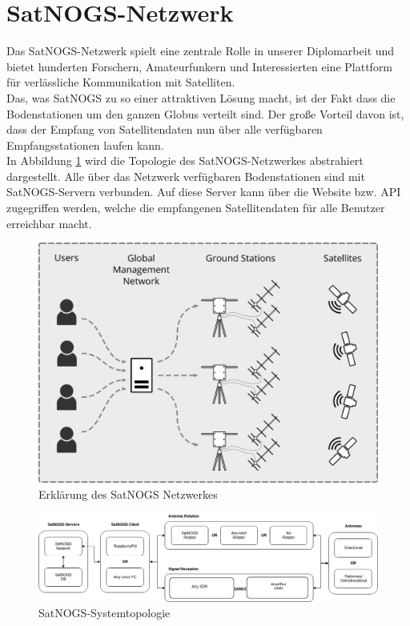 \section{SatNOGS-Netzwerk}
\label{sec:sat}
Das SatNOGS-Netzwerk spielt eine zentrale Rolle in unserer Diplomarbeit und bietet hunderten Forschern, Amateurfunkern und Interessierten eine Plattform für verlässliche Kommunikation mit Satelliten.\\

Das, was SatNOGS zu so einer attraktiven Lösung macht, ist der Fakt dass die Bodenstationen um den ganzen Globus verteilt sind. Der große Vorteil davon ist, dass der Empfang von Satellitendaten nun über alle verfügbaren Empfangsstationen laufen kann.\\

In Abbildung \ref{fig:SatNOGS_Erklärung} wird die Topologie des SatNOGS-Netzwerkes abstrahiert dargestellt.
Alle über das Netzwerk verfügbaren Bodenstationen sind mit SatNOGS-Servern verbunden. Auf diese Server kann über die Website bzw. API zugegriffen werden, welche die empfangenen Satellitendaten für alle Benutzer erreichbar macht.

\begin{figure}[h!]
	\centering
	\includegraphics[width=\textwidth]{../ref/SatNOGS_explanation}
	\caption{Erklärung des SatNOGS Netzwerkes}
	\label{fig:SatNOGS_Erklärung}
\end{figure}	

\begin{figure}[h!]
	\centering
	\includegraphics[width=\textwidth]{../ref/SatNOGS_BlockDiagram}
	\caption{SatNOGS-Systemtopologie}
	\label{fig:SatNOGS_Systemtopologie}
\end{figure}

